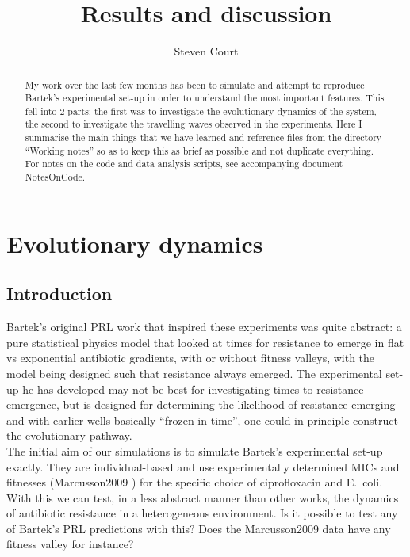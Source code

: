 \documentclass[a4paper,10pt]{article}
\title{Results and discussion}
\author{Steven Court}
\begin{document}
\maketitle

\begin{abstract}
 My work over the last few months has been to simulate and attempt to reproduce Bartek's experimental set-up in order to understand the most important features. 
 This fell into 2 parts: the first was to investigate the evolutionary dynamics of the system, the second to investigate the travelling waves observed
 in the experiments. 
 Here I summarise the main things that we have learned and reference files from the directory ``Working notes'' so as to keep this as brief as possible and
 not duplicate everything.
 For notes on the code and data analysis scripts, see accompanying document NotesOnCode.
\end{abstract}



\section{Evolutionary dynamics}

\subsection{Introduction}
Bartek's original PRL work that inspired these experiments was quite abstract: a pure statistical physics model that looked at times for resistance to emerge in flat vs exponential 
antibiotic gradients, with or without fitness valleys, with the model being designed such that resistance always emerged. 
The experimental set-up he has developed may not be best for investigating times to resistance emergence, but is designed for determining the likelihood of resistance emerging
and with earlier wells basically “frozen in time”, one could in principle construct the evolutionary pathway.\\

The initial aim of our simulations is to simulate Bartek's experimental set-up exactly. They are individual-based and use experimentally determined MICs and fitnesses (Marcusson2009 \cite{}) 
for the specific choice of ciprofloxacin and E.~coli. With this we can test, in a less abstract manner than other works, the dynamics of antibiotic resistance in a heterogeneous environment.
Is it possible to test any of Bartek's PRL predictions with this? Does the Marcusson2009 data have any fitness valley for instance?\\
\end{document}
